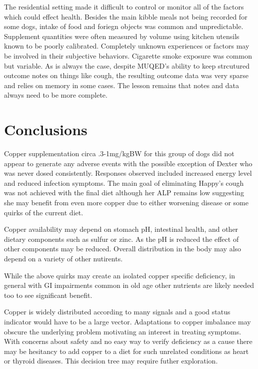 The residential setting made it difficult to control or monitor
all of the factors which could effect health. Besides the main
kibble meals not being recorded for some dogs, intake of food
and foriegn objects was common and unpredictable. 
Supplement quantities were often measured by volume using kitchen
utensils known to be poorly calibrated. 
Completely unknown experiences or factors may be involved in their
subjective behaviors.  Cigarette smoke exposure was common
but variable.
As is always the case, despite MUQED's ability to keep strcutured
outcome notes on things like cough, the resulting outcome
data was very sparse and relies on memory in some cases.
The lesson remains that notes and data always need to be
more complete. 



\section{Conclusions}


Copper supplementation circa .3-1mg/kgBW for this group of dogs
did not appear to generate any adverse events with the possible
exception of Dexter who was never dosed consistently. 
Responses observed included increased energy level and  reduced 
infection symptoms.
The main goal of eliminating Happy's
cough was not achieved with the final diet although her ALP
remains low suggesting she may benefit from even more copper
due to either worsening disease or some quirks of the current diet.

Copper availability may depend on stomach pH, intestinal health,
 and other dietary
components such as sulfur or zinc. As the pH is reduced the effect of
other components may be reduced. Overall distribution in the body
may also depend on a variety of other nutirents. 

While the above quirks may create an isolated copper specific deficiency,
in general with GI impairments common in old age other nutrients
are likely needed too to see significant benefit.

Copper is widely distributed according to many signals and
a good status indicator would have to be a large vector.
Adaptations to copper imbalance may obscure the underlying problem
motivating an interest in treating symptoms. With concerns about
safety and no easy way to verify deficiency as a cause there may
be hesitancy to add copper to a diet for such unrelated conditions
as heart or thyroid diseases.  This decision tree may 
require futher exploration. 


